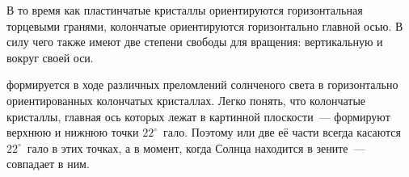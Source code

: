 В то время как пластинчатые кристаллы ориентируются горизонтальная торцевыми гранями, колончатые ориентируются горизонтально главной осью. В силу чего также имеют две степени свободы для вращения: вертикальную и вокруг своей оси.   

 формируется в ходе различных преломлений солнченого света в горизонтально ориентированных колончатых кристаллах. Легко понять, что колончатые кристаллы, главная ось которых лежат в картинной плоскости~--- формируют верхнюю и нижнюю точки $22^\circ$~гало. Поэтому  или две её части всегда касаются $22^\circ$~гало в этих точках, а в момент, когда Солнца находится в зените~--- совпадает в ним. 

